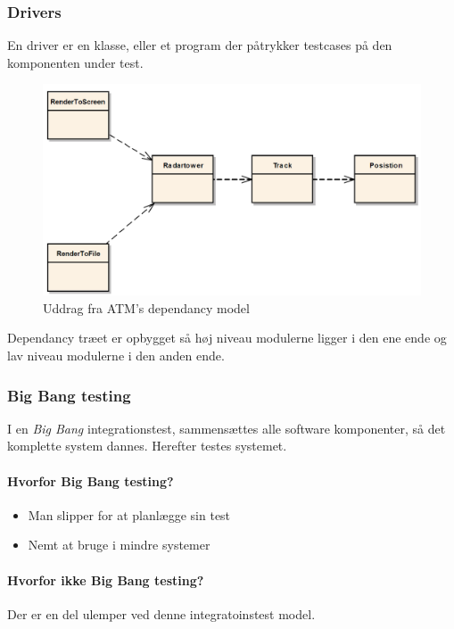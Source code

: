 \subsubsection{Drivers}
En driver er en klasse, eller et program der påtrykker testcases på den komponenten under test.

\begin{figure}[H]
\centering
\includegraphics[width=0.8\linewidth]{figs/dependancyATM.PNG}
\caption{Uddrag fra ATM's dependancy model}
\label{fig:dependancyATM}
\end{figure}

Dependancy træet er opbygget så høj niveau modulerne ligger i den ene ende og lav niveau modulerne i den anden ende.


\subsubsection{Big Bang testing}
I en \textit{Big Bang} integrationstest, sammensættes alle software komponenter, så det komplette system dannes. Herefter testes systemet.

\paragraph{Hvorfor Big Bang testing?}
\begin{itemize}
	\item Man slipper for at planlægge sin test
	\item Nemt at bruge i mindre systemer
\end{itemize}

\paragraph{Hvorfor ikke Big Bang testing?}
Der er en del ulemper ved denne integratoinstest model.

